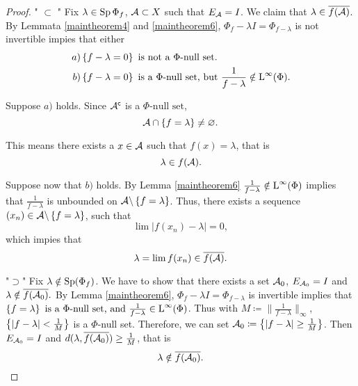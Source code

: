 \begin{proof}
 " $\subset$ "
 Fix $\lambda \in \operatorname{Sp} \Phi_f$, $\mathcal{A} \subset X$ such that $E_\mathcal{A} = I$.
 We claim that $\lambda \in \overline{f(\mathcal{A})}$. By Lemmata \ref{maintheorem4}
 and \ref{maintheorem6}, $\Phi_f - \lambda I= \Phi_{f - \lambda}$ is 
 not invertible impies that either
\begin{align*}
  \left.  a\right)& \left\lbrace f- \lambda = 0 \right\rbrace \text{ is not a }\Phi
  \text{-null set}.\\
  \left.  b\right)& \left\lbrace f - \lambda =0 \right\rbrace \text{ is a }\Phi\text{-null set,
    but } \frac{1}{f- \lambda} \notin {\text{L}^\infty }(\Phi).
\end{align*}

Suppose $a)$ holds. Since $\mathcal{A}^\mathsf{c}$ is a $\Phi\text{-null set}$,
\[
\mathcal{A} \cap \left\lbrace f= \lambda \right\rbrace \neq \varnothing .
\]

This means there exists a $x \in \mathcal{A}$ such that $f(x) = \lambda$, that is
\[
\lambda \in f(\mathcal{A}).
\]

Suppose now that $b)$ holds. By Lemma \ref{maintheorem6} $\frac{1}{f- \lambda}
\notin {\text{L}^\infty }(\Phi)$ implies that $\frac{1}{f- \lambda}$ is unbounded on
$\mathcal{A} \backslash \left\lbrace f= \lambda \right\rbrace$. Thus, there exists a sequence
$(x_n) \in \mathcal{A} \backslash \left\lbrace f= \lambda \right\rbrace$, such that
\[
 \lim | f(x_n) - \lambda| =0,
\]
which impies that
\[
\lambda = \lim f(x_n) \in \overline{f(\mathcal{A})}.
\]

"$\supset$"
Fix $\lambda \notin \operatorname{Sp} (\Phi_f)$. We have to show that there exists a set
$\mathcal{A}_0$, $E_{\mathcal{A}_0} = I$ and $\lambda \notin \overline{f(\mathcal{A}_0)}.$
By Lemma \ref{maintheorem6}, $\Phi_f - \lambda I= \Phi_{f- \lambda}$ is 
invertible implies that $ \left\lbrace f = \lambda \right\rbrace  \text{ is a }   \Phi
\text{-null set,} \text{ and } \frac{1}{f - \lambda }  \in {\text{L}^\infty }(\Phi)$. Thus with 
$M \coloneqq \| \frac{1}{f - \lambda} \|_\infty$,
$\left\lbrace | f- \lambda | < \frac{1}{M} \right\rbrace$ is a $\Phi$-null set. Therefore,
we can set $\mathcal{A}_0 \coloneqq \left\lbrace | f- \lambda | \geq \frac{1}{M} \right\rbrace $.
Then $E_{\mathcal{A}_0} = I$ and $d(\lambda, \overline{f(\mathcal{A}_0)}) \geq
\frac{1}{M}$, that is 
\[
\lambda \notin \overline{f(\mathcal{A}_0)}.
\]

  
\end{proof}


